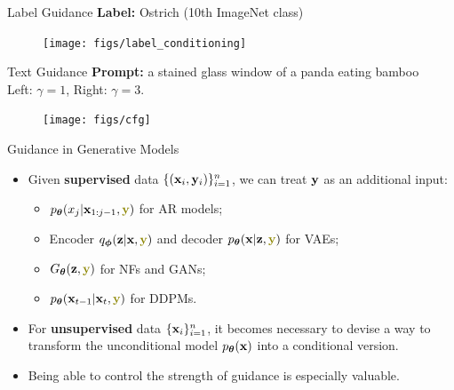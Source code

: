 \documentclass{beamer}
\begin{document}
\begin{frame}{Label Guidance}
	\textbf{Label:} Ostrich (10th ImageNet class) 
	\begin{figure}
		\texttt{[image: figs/label\_conditioning]}
	\end{figure}
\end{frame}
\begin{frame}{Text Guidance}
	\textbf{Prompt:} a stained glass window of a panda eating bamboo \\
	Left: $\gamma = 1$, Right: $\gamma = 3$.
	\begin{figure}
		\texttt{[image: figs/cfg]}
	\end{figure}
\end{frame}
\begin{frame}{Guidance in Generative Models}
	\begin{itemize}
	\item Given \textbf{supervised} data $\{(\mathbf{x}_i, \mathbf{y}_i)\}_{i=1}^n$, we can treat $\mathbf{y}$ as an additional input:
	\begin{itemize}
		\item $\pt(x_j | \bx_{1:j-1}, {\color{olive}\by})$ for AR models;
		\item Encoder $q_{\bphi}(\bz | \bx, {\color{olive}\by})$ and decoder $\pt(\bx | \bz, {\color{olive}\by})$ for VAEs;
		\item $G_{\btheta}(\bz, {\color{olive}\by})$ for NFs and GANs;
		\item $\pt(\bx_{t-1} | \bx_t, {\color{olive}\by})$ for DDPMs.
	\end{itemize}
	\eqpause
	\item For \textbf{unsupervised} data $\{\mathbf{x}_i\}_{i=1}^n$, it becomes necessary to devise a way to transform the unconditional model $p_{\boldsymbol{\theta}}(\mathbf{x})$ into a conditional version.
	\eqpause
	\item Being able to control the strength of guidance is especially valuable.
	\end{itemize}
\end{frame}
\end{document}
